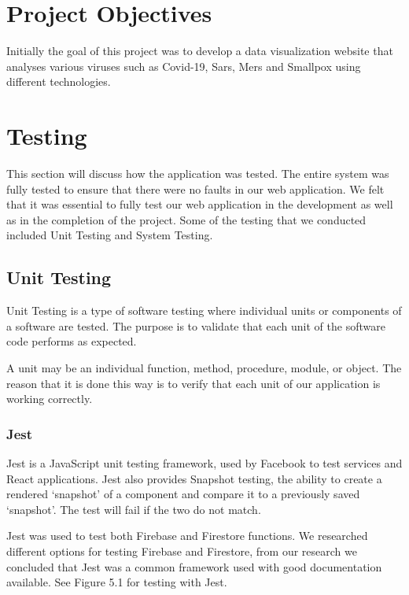 \section{Project Objectives}
Initially the goal of this project was to develop a data visualization website that analyses various viruses such as Covid-19, Sars, Mers and Smallpox using different technologies.

\section{Testing}
This section will discuss how the application was tested.
The entire system was fully tested to ensure that there were no faults in our web application.
We felt that it was essential to fully test our web application in the development as well as in the completion of the project.
Some of the testing that we conducted included Unit Testing and System Testing.


\subsection{Unit Testing}
Unit Testing is a type of software testing where individual units or components of a software are tested. 
The purpose is to validate that each unit of the software code performs as expected.

A unit may be an individual function, method, procedure, module, or object.\cite{unittest}
The reason that it is done this way is to verify that each unit of our application is working correctly.


\subsubsection{Jest}
Jest is a JavaScript unit testing framework, used by Facebook to test services and React applications.
Jest also provides Snapshot testing, the ability to create a rendered ‘snapshot’ of a component and compare it to a previously saved ‘snapshot’. The test will fail if the two do not match.\cite{jest}

\vspace{5mm}

Jest was used to test both Firebase and Firestore functions. We researched different options for testing Firebase and Firestore, from our research we concluded that Jest was a common framework used with good documentation available. See Figure 5.1 for testing with Jest.

